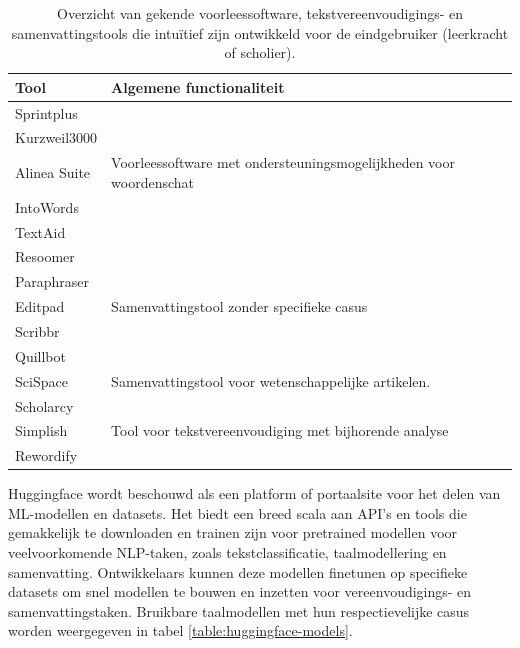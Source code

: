 \begin{center}
	\begin{table}[H]
		\begin{tabular}{ | m{4cm} | m{12cm} | } 
		\hline
		\textbf{Tool} & Algemene functionaliteit \\
		\hline
		Sprintplus & \\
		Kurzweil3000 & \\
		Alinea Suite & Voorleessoftware met ondersteuningsmogelijkheden voor woordenschat \\
		IntoWords & \\
		TextAid & \\
		\hline
		Resoomer &  \\
		Paraphraser & \\
		Editpad & Samenvattingstool zonder specifieke casus \\
		Scribbr & \\
		Quillbot & \\
		\hline
		SciSpace & Samenvattingstool voor wetenschappelijke artikelen. \\
		Scholarcy & \\
		\hline
		Simplish & Tool voor tekstvereenvoudiging met bijhorende analyse\\
		Rewordify & \\
		\hline
		\end{tabular}
	\caption{Overzicht van gekende voorleessoftware, tekstvereenvoudigings- en samenvattingstools die intuïtief zijn ontwikkeld voor de eindgebruiker (leerkracht of scholier).}
	\label{table:overview-tools}
	\end{table}
\end{center}

\medspace

Huggingface wordt beschouwd als een platform of portaalsite voor het delen van ML-modellen en datasets. Het biedt een breed scala aan API's en tools die gemakkelijk te downloaden en trainen zijn voor pretrained modellen voor veelvoorkomende NLP-taken, zoals tekstclassificatie, taalmodellering en samenvatting. Ontwikkelaars kunnen deze modellen finetunen op specifieke datasets om snel modellen te bouwen en inzetten voor vereenvoudigings- en samenvattingstaken. Bruikbare taalmodellen met hun respectievelijke casus worden weergegeven in tabel \ref{table:huggingface-models}.

\medspace

